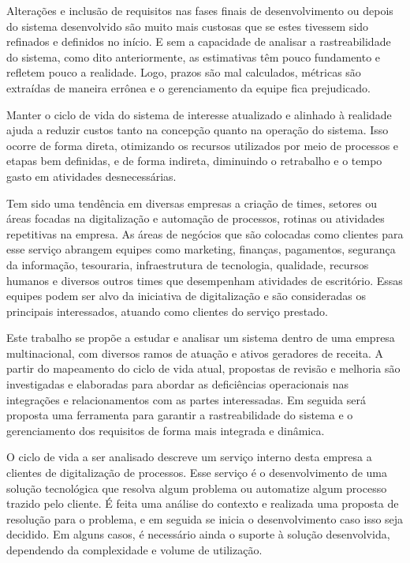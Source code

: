 	Alterações e inclusão de requisitos nas fases finais de desenvolvimento ou depois 
	do sistema desenvolvido são muito mais custosas que se estes tivessem sido 
	refinados e definidos no início. E sem a capacidade de analisar a rastreabilidade do 
	sistema, como dito anteriormente, as estimativas têm pouco fundamento e 
	refletem pouco a realidade. Logo, prazos são mal calculados, métricas são extraídas 
	de maneira errônea e o gerenciamento da equipe fica prejudicado. 

	Manter o ciclo de vida do sistema de interesse atualizado e alinhado à realidade 
	ajuda a reduzir custos tanto na concepção quanto na operação do sistema. Isso ocorre 
	de forma direta, otimizando os recursos utilizados por meio de processos e etapas bem 
	definidas, e de forma indireta, diminuindo o retrabalho e o tempo gasto em atividades desnecessárias.

	Tem sido uma tendência em diversas empresas a criação de times, setores ou áreas focadas na digitalização 
	e automação de processos, rotinas ou atividades repetitivas na empresa.
	As áreas de negócios {\color{blue}que são colocadas como clientes para esse serviço} abrangem equipes 
	como marketing, finanças, pagamentos, segurança da informação, tesouraria, infraestrutura de tecnologia, 
	qualidade, recursos humanos e diversos outros times que desempenham atividades de escritório. Essas equipes 
	podem ser alvo da iniciativa de digitalização e são consideradas os principais interessados, atuando como 
	clientes do serviço prestado.

	Este trabalho se propõe a estudar e analisar um sistema dentro de uma empresa multinacional, com 
	diversos ramos de atuação e ativos geradores de receita. A partir do mapeamento do ciclo de vida 
	atual, propostas de revisão e melhoria são investigadas e elaboradas para abordar as deficiências 
	operacionais nas integrações e relacionamentos com as partes interessadas. Em seguida será proposta 
	uma ferramenta para garantir a rastreabilidade do sistema e o gerenciamento dos requisitos de forma 
	mais integrada e dinâmica.
	
	O ciclo de vida a ser analisado descreve um serviço interno desta empresa a clientes de digitalização de processos. Esse serviço é o desenvolvimento de uma solução 
	tecnológica que resolva algum problema ou automatize algum processo trazido pelo 
	cliente. É feita uma análise do contexto e realizada uma proposta de resolução 
	para o problema, e em seguida se inicia o desenvolvimento caso isso seja decidido. 
	Em alguns casos, é necessário ainda o suporte à solução desenvolvida, dependendo 
	da complexidade e volume de utilização. 

